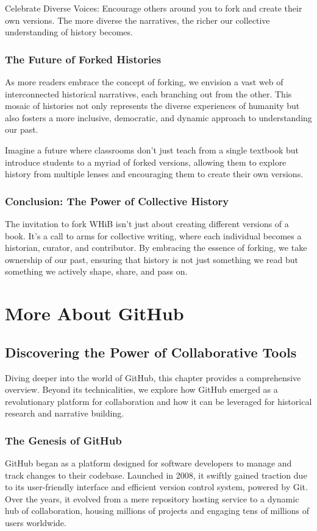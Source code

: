 \documentclass[a4paper,12pt]{book}
\begin{document}
Celebrate Diverse Voices: Encourage others around you to fork and create their own versions. The more diverse the narratives, the richer our collective understanding of history becomes.

\subsection*{The Future of Forked Histories}

As more readers embrace the concept of forking, we envision a vast web of interconnected historical narratives, each branching out from the other. This mosaic of histories not only represents the diverse experiences of humanity but also fosters a more inclusive, democratic, and dynamic approach to understanding our past.

Imagine a future where classrooms don't just teach from a single textbook but introduce students to a myriad of forked versions, allowing them to explore history from multiple lenses and encouraging them to create their own versions.

\subsection*{Conclusion: The Power of Collective History}

The invitation to fork WHiB isn't just about creating different versions of a book. It's a call to arms for collective writing, where each individual becomes a historian, curator, and contributor. By embracing the essence of forking, we take ownership of our past, ensuring that history is not just something we read but something we actively shape, share, and pass on.

\chapter{More About GitHub}
\section*{Discovering the Power of Collaborative Tools}
Diving deeper into the world of GitHub, this chapter provides a comprehensive overview. Beyond its technicalities, we explore how GitHub emerged as a revolutionary platform for collaboration and how it can be leveraged for historical research and narrative building.

\subsection*{The Genesis of GitHub}
GitHub began as a platform designed for software developers to manage and track changes to their codebase. Launched in 2008, it swiftly gained traction due to its user-friendly interface and efficient version control system, powered by Git. Over the years, it evolved from a mere repository hosting service to a dynamic hub of collaboration, housing millions of projects and engaging tens of millions of users worldwide.
\end{document}

